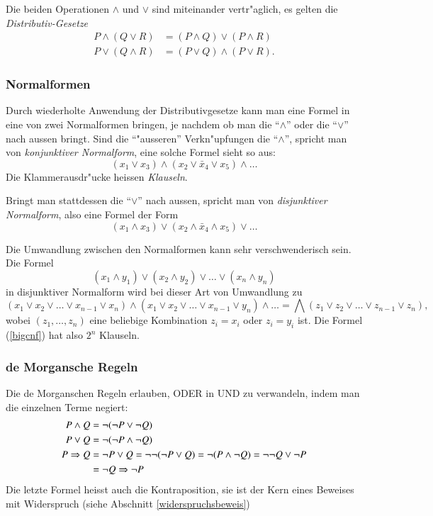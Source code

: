 Die beiden Operationen $\wedge$ und $\vee$ sind miteinander vertr"aglich,
es gelten die {\em Distributiv-Gesetze}
\begin{align*}
P\wedge(Q\vee R)&=(P\wedge Q)\vee (P\wedge R)\\
P\vee(Q\wedge R)&=(P\vee Q)\wedge (P\vee R).
\end{align*}

\subsubsection{Normalformen}
Durch wiederholte Anwendung der Distributivgesetze kann man 
eine Formel in eine von zwei Normalformen bringen, je nachdem
ob man die ``$\wedge$'' oder die ``$\vee$'' nach aussen bringt.
Sind die ``"ausseren'' Verkn"upfungen die ``$\wedge$'', spricht
man von {\em konjunktiver Normalform}, eine solche Formel sieht so aus:
\[
(x_1\vee x_3)\wedge(x_2\vee \bar x_4\vee x_5)\wedge\dots
\]
Die Klammerausdr"ucke heissen {\em Klauseln}.

Bringt man stattdessen die ``$\vee$'' nach aussen, spricht man von
{\em disjunktiver Normalform}, also eine Formel der Form
\[
(x_1\wedge x_3)\vee(x_2\wedge \bar x_4\wedge x_5)\vee\dots
\]

Die Umwandlung zwischen den Normalformen kann sehr verschwenderisch sein.
Die Formel
\[
(x_1\wedge y_1)\vee(x_2\wedge y_2)\vee\dots\vee (x_n\wedge y_n)
\]
in disjunktiver Normalform wird bei dieser Art von Umwandlung zu
\begin{equation}
(x_1\vee x_2\vee\dots\vee x_{n-1}\vee x_n)
\wedge
(x_1\vee x_2\vee\dots\vee x_{n-1}\vee y_n)
\wedge
\dots 
=\bigwedge (z_1\vee z_2\vee\dots \vee z_{n-1}\vee z_n),
\label{bigcnf}
\end{equation}
wobei $(z_1,\dots,z_n)$ eine beliebige Kombination $z_i=x_i$ oder $z_i=y_i$
ist. Die Formel (\ref{bigcnf}) hat also $2^n$ Klauseln.

\subsubsection{de Morgansche Regeln}
Die de Morganschen Regeln erlauben, ODER in UND zu verwandeln, indem
man die einzelnen Terme negiert:
\begin{align}
P\wedge Q&= \neg(\neg P\vee\neg Q)\notag\\
P\vee Q&= \neg(\neg P\wedge\neg Q)\notag\\
P\Rightarrow Q&=\neg P\vee Q=\neg\neg(\neg P\vee Q)=\neg(P\wedge\neg Q)=\neg\neg Q\vee \neg P\notag\\
&=\neg Q\Rightarrow \neg P\label{kontraposition}
\end{align}
Die letzte Formel heisst auch die Kontraposition, sie ist der Kern
eines Beweises mit Widerspruch (siehe Abschnitt \ref{widerspruchsbeweis})


